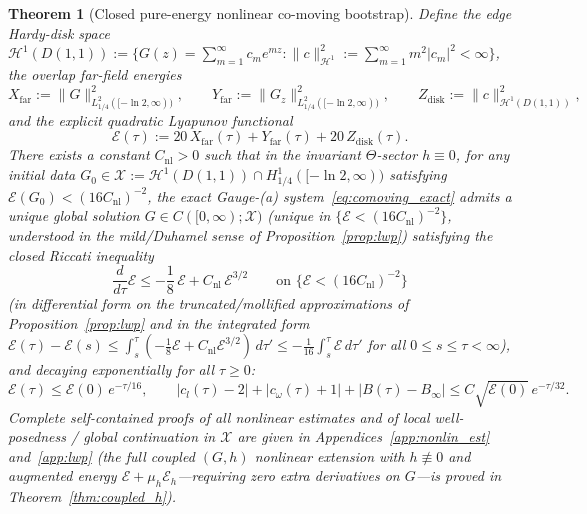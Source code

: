 \documentclass[11pt,a4paper]{article}
\newtheorem{thm}{Theorem}
\begin{document}
\begin{thm}[Closed pure-energy nonlinear co-moving bootstrap]\label{thm:nonlinear_bootstrap}
Define the edge Hardy-disk space
$\mathcal{H}^1(D(1,1)) := \{G(z) = \sum_{m=1}^\infty c_m e^{mz} : \|c\|_{\mathcal{H}^1}^2 := \sum_{m=1}^\infty m^2|c_m|^2 < \infty\}$,
the overlap far-field energies
\[
X_{\mathrm{far}} := \|G\|_{L^2_{1/4}([-\ln 2,\infty))}^2, \qquad
Y_{\mathrm{far}} := \|G_z\|_{L^2_{1/4}([-\ln 2,\infty))}^2, \qquad
Z_{\mathrm{disk}} := \|c\|_{\mathcal{H}^1(D(1,1))}^2,
\]
and the explicit quadratic Lyapunov functional
\[
\mathcal{E}(\tau) := 20\,X_{\mathrm{far}}(\tau) + Y_{\mathrm{far}}(\tau) + 20\,Z_{\mathrm{disk}}(\tau).
\]
There exists a constant $C_{\mathrm{nl}}>0$ such that in the invariant $\Theta$-sector $h\equiv 0$,
for any initial data $G_0\in\mathcal{X}:=\mathcal{H}^1(D(1,1))\cap H^1_{1/4}([-\ln 2,\infty))$ satisfying
$\mathcal{E}(G_0) < (16 C_{\mathrm{nl}})^{-2}$, the exact Gauge-(a) system~\eqref{eq:comoving_exact}
admits a unique global solution $G\in C([0,\infty);\mathcal{X})$ (unique in $\{\mathcal{E}<(16 C_{\mathrm{nl}})^{-2}\}$, understood in the mild/Duhamel sense of Proposition~\ref{prop:lwp}) satisfying the closed Riccati inequality
\begin{equation}\label{eq:riccati_bootstrap}
\frac{d}{d\tau}\mathcal{E} \le -\frac{1}{8}\,\mathcal{E} + C_{\mathrm{nl}}\,\mathcal{E}^{3/2}
\qquad\text{on }\{\mathcal{E} < (16 C_{\mathrm{nl}})^{-2}\}
\end{equation}
(in differential form on the truncated/mollified approximations of Proposition~\ref{prop:lwp} and in the integrated form $\mathcal{E}(\tau)-\mathcal{E}(s)\le\int_s^\tau(-\frac18\mathcal{E}+C_{\mathrm{nl}}\mathcal{E}^{3/2})\,d\tau'\le -\frac{1}{16}\int_s^\tau\mathcal{E}\,d\tau'$ for all $0\le s\le\tau<\infty$), and decaying exponentially for all $\tau\ge 0$:
\[
\mathcal{E}(\tau) \le \mathcal{E}(0)\,e^{-\tau/16}, \qquad
|c_l(\tau)-2| + |c_\omega(\tau)+1| + |B(\tau)-B_\infty| \le C\sqrt{\mathcal{E}(0)}\,e^{-\tau/32}.
\]
Complete self-contained proofs of all nonlinear estimates and of local well-posedness / global
continuation in $\mathcal{X}$ are given in Appendices~\ref{app:nonlin_est} and~\ref{app:lwp}
(the full coupled $(G,h)$ nonlinear extension with $h\not\equiv 0$ and augmented energy
$\mathcal{E}+\mu_h\mathcal{E}_h$---requiring zero extra derivatives on $G$---is proved in
Theorem~\ref{thm:coupled_h}).
\end{thm}
\end{document}
